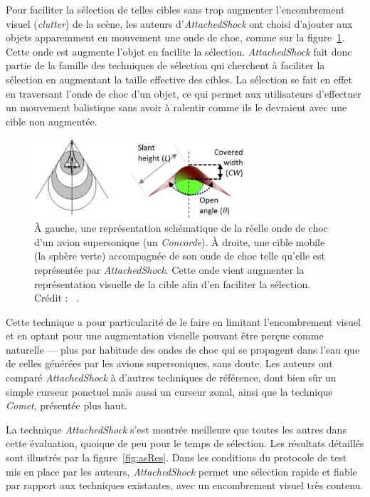 	Pour faciliter la sélection de telles cibles sans trop augmenter l'encombrement visuel (\emph{clutter}) de la scène, les auteurs d'\emph{AttachedShock} ont choisi d'ajouter aux objets apparemment en mouvement une onde de choc, comme sur la figure~\ref{fig:asas}. Cette onde est augmente l'objet en facilite la sélection. \emph{AttachedShock} fait donc partie de la famille des techniques de sélection qui cherchent à faciliter la sélection en augmentant la taille effective des cibles. La sélection se fait en effet en \og traversant \fg{} l'onde de choc d'un objet, ce qui permet aux utilisateurs d'effectuer un mouvement balistique sans avoir à ralentir comme ils le devraient avec une cible non augmentée.

	\begin{figure}[!htb]
		\centering
		\includegraphics[width=0.70\textwidth]{figures/ch2/asas}
		\caption[\emph{AttachedShock}, onde de choc]{À gauche, une représentation schématique de la réelle onde de choc d'un avion supersonique (un \emph{Concorde}). À droite, une cible mobile (la sphère verte) accompagnée de son onde de choc telle qu'elle est représentée par \emph{AttachedShock}. Cette onde vient augmenter la représentation visuelle de la cible afin d'en faciliter la sélection. Crédit : ~\cite{you2012attachedshock}.}
		\label{fig:asas}
	\end{figure}
	
Cette technique a pour particularité de le faire en limitant l'encombrement visuel et en optant pour une augmentation visuelle pouvant être perçue comme \og naturelle \fg{} --- plus par habitude des ondes de choc qui se propagent dans l'eau que de celles générées par les avions supersoniques, sans doute. Les auteurs ont comparé \emph{AttachedShock} à d'autres techniques de référence, dont bien sûr un simple curseur ponctuel mais aussi un curseur zonal, ainsi que la technique \emph{Comet}, présentée plus haut.

La technique \emph{AttachedShock} s'est montrée meilleure que toutes les autres dans cette évaluation, quoique de peu pour le temps de sélection. Les résultats détaillés sont illustrés par la figure~\ref{fig:asRes}. Dans les conditions du protocole de test mis en place par les auteurs, \emph{AttachedShock} permet une sélection rapide et fiable par rapport aux techniques existantes, avec un encombrement visuel très contenu.

